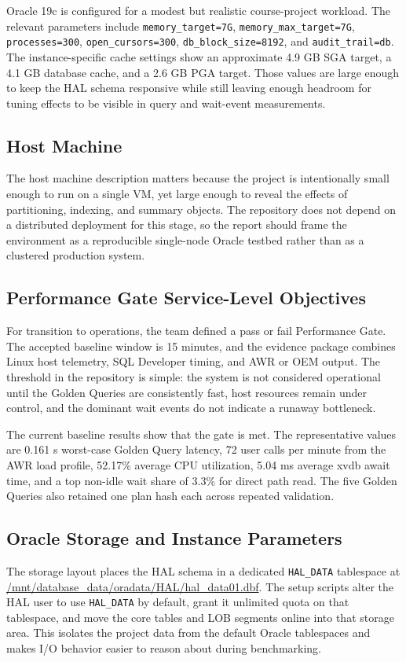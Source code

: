 \documentclass[conference]{IEEEtran}
\begin{document}
Oracle 19c is configured for a modest but realistic course-project workload. The relevant parameters include \verb|memory_target=7G|, \verb|memory_max_target=7G|, \verb|processes=300|, \verb|open_cursors=300|, \verb|db_block_size=8192|, and \verb|audit_trail=db|. The instance-specific cache settings show an approximate 4.9 GB SGA target, a 4.1 GB database cache, and a 2.6 GB PGA target. Those values are large enough to keep the HAL schema responsive while still leaving enough headroom for tuning effects to be visible in query and wait-event measurements.

\subsection{Host Machine}
The host machine description matters because the project is intentionally small enough to run on a single VM, yet large enough to reveal the effects of partitioning, indexing, and summary objects. The repository does not depend on a distributed deployment for this stage, so the report should frame the environment as a reproducible single-node Oracle testbed rather than as a clustered production system.

\subsection{Performance Gate Service-Level Objectives}
For transition to operations, the team defined a pass or fail Performance Gate. The accepted baseline window is 15 minutes, and the evidence package combines Linux host telemetry, SQL Developer timing, and AWR or OEM output. The threshold in the repository is simple: the system is not considered operational until the Golden Queries are consistently fast, host resources remain under control, and the dominant wait events do not indicate a runaway bottleneck.

The current baseline results show that the gate is met. The representative values are 0.161 s worst-case Golden Query latency, 72 user calls per minute from the AWR load profile, 52.17\% average CPU utilization, 5.04 ms average xvdb await time, and a top non-idle wait share of 3.3\% for direct path read. The five Golden Queries also retained one plan hash each across repeated validation.

\subsection{Oracle Storage and Instance Parameters}
The storage layout places the HAL schema in a dedicated \verb|HAL_DATA| tablespace at \url{/mnt/database_data/oradata/HAL/hal_data01.dbf}. The setup scripts alter the HAL user to use \verb|HAL_DATA| by default, grant it unlimited quota on that tablespace, and move the core tables and LOB segments online into that storage area. This isolates the project data from the default Oracle tablespaces and makes I/O behavior easier to reason about during benchmarking.
\end{document}
